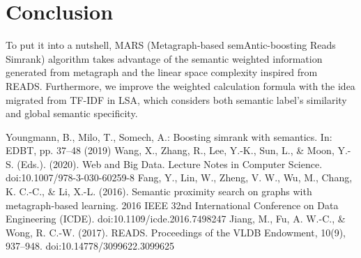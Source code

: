 \documentclass[a4paper, 12pt]{article} %
\begin{document}

\section{Conclusion}
    
    To put it into a nutshell, MARS (Metagraph-based semAntic-boosting Reads Simrank) algorithm takes advantage of the semantic weighted information generated from metagraph and the linear space complexity inspired from READS. Furthermore, we improve the weighted calculation formula with the idea migrated from TF-IDF in LSA, which considers both semantic label's similarity and global semantic specificity.

\bigskip    

\begin{thebibliography}{99}
     Youngmann, B., Milo, T., Somech, A.: Boosting simrank with semantics. In: EDBT, pp. 37–48 (2019)
     Wang, X., Zhang, R., Lee, Y.-K., Sun, L., \& Moon, Y.-S. (Eds.). (2020). Web and Big Data. Lecture Notes in Computer Science. doi:10.1007/978-3-030-60259-8
     Fang, Y., Lin, W., Zheng, V. W., Wu, M., Chang, K. C.-C., \& Li, X.-L. (2016). Semantic proximity search on graphs with metagraph-based learning. 2016 IEEE 32nd International Conference on Data Engineering (ICDE). doi:10.1109/icde.2016.7498247
     Jiang, M., Fu, A. W.-C., \& Wong, R. C.-W. (2017). READS. Proceedings of the VLDB Endowment, 10(9), 937–948. doi:10.14778/3099622.3099625 
\end{thebibliography}


\end{document}
